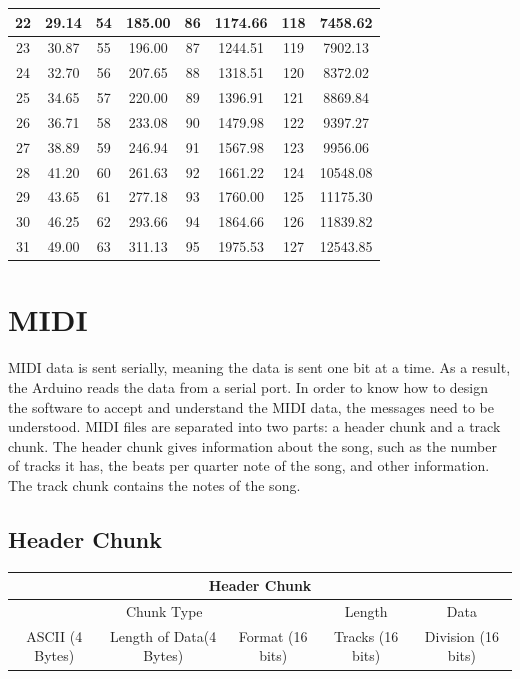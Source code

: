 \documentclass[11pt, a4paper]{report}
\begin{document}
\begin{center}
\begin{tabular}{|c|c||c|c||c|c||c|c|}
22 & 29.14 & 54 & 185.00& 86 & 1174.66 & 118 & 7458.62 \\
 \hline
23 & 30.87 & 55 & 196.00& 87 & 1244.51 & 119 & 7902.13 \\
 \hline
24 & 32.70 & 56 & 207.65& 88 & 1318.51 & 120 & 8372.02 \\
 \hline
25 & 34.65 & 57 & 220.00& 89 & 1396.91 & 121 & 8869.84 \\
 \hline
26 & 36.71 & 58 & 233.08& 90 & 1479.98 & 122 & 9397.27 \\
 \hline
27 & 38.89 & 59 & 246.94& 91 & 1567.98 & 123 & 9956.06 \\
 \hline
28 & 41.20 & 60 & 261.63& 92 & 1661.22 & 124 & 10548.08 \\
 \hline
29 & 43.65 & 61 & 277.18& 93 & 1760.00 & 125 & 11175.30 \\
 \hline
30 & 46.25 & 62 & 293.66& 94 & 1864.66 & 126 & 11839.82 \\
 \hline
31 & 49.00 & 63 & 311.13& 95 & 1975.53 & 127 &  12543.85 \\
 \hline
 \end{tabular}
\end{center}


\section{MIDI} \label{MIDIMESSAGE}

MIDI data is sent serially, meaning the data is sent one bit at a time. As a result, the Arduino reads the data from a serial port. In order to know how to design the software to accept and understand the MIDI data, the messages need to be understood. MIDI files are separated into two parts: a header chunk and a track chunk. The header chunk gives information about the song, such as the number of tracks it has, the beats per quarter note of the song, and other information. The track chunk contains the notes of the song.

\subsection{Header Chunk}

\label{fig:header}
\begin{center}
 \begin{tabular}{||c | c | c | c | c||} 
 \hline
  \multicolumn{5}{|c|}{Header Chunk} \\ 
 \hline
  \multicolumn{3}{|c|}{Chunk Type}  & Length & Data \\
 \hline
  ASCII (4 Bytes) & Length of Data(4 Bytes)  & Format (16 bits) & Tracks (16 bits) & Division (16 bits) \\
 
 \hline
\end{tabular}
\end{center}
\end{document}

